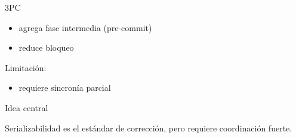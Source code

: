 \documentclass[institutional,screen,none]{ua-engineering-v6-beamer}
\begin{document}
\begin{frame}{3PC}
\begin{itemize}
\item agrega fase intermedia (pre-commit)
\item reduce bloqueo
\end{itemize}

\pause
Limitación:
\begin{itemize}
\item requiere sincronía parcial
\end{itemize}
\end{frame}


\begin{frame}{Idea central}
\begin{block}{}
Serializabilidad es el estándar de corrección, pero requiere coordinación fuerte.
\end{block}
\end{frame}
\end{document}
